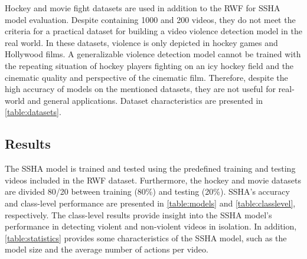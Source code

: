 \documentclass[review]{elsarticle}
\begin{document}
Hockey and movie fight datasets are used in addition to the RWF for SSHA model evaluation. Despite containing 1000 and 200 videos, they do not meet the criteria for a practical dataset for building a video violence detection model in the real world. In these datasets, violence is only depicted in hockey games and Hollywood films. A generalizable violence detection model cannot be trained with the repeating situation of hockey players fighting on an icy hockey field and the cinematic quality and perspective of the cinematic film. Therefore, despite the high accuracy of models on the mentioned datasets, they are not useful for real-world and general applications. Dataset characteristics are presented in \autoref{table:datasets}.

\begin{table}[!htbp]
\caption{Video violence datasets characteristics. }
\label{table:datasets}
\end{table}

\subsection{Results}

The SSHA model is trained and tested using the predefined training and testing videos included in the RWF dataset. Furthermore, the hockey and movie datasets are divided 80/20 between training (80\%) and testing (20\%). SSHA's accuracy and class-level performance are presented in \autoref{table:models} and \ref{table:classlevel}, respectively. The class-level results provide insight into the SSHA model's performance in detecting violent and non-violent videos in isolation. In addition, \autoref{table:statistics} provides some characteristics of the SSHA model, such as the model size and the average number of actions per video.
\end{document}
